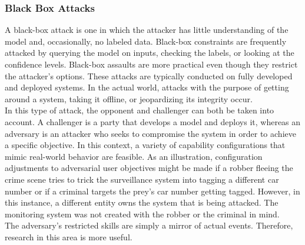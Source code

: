 \documentclass[ 12pt,a4paper,twocolumn,fleqn]{article}
\begin{document}
\subsubsection{Black Box Attacks}
A black-box attack is one in which the attacker has little understanding of the model and, occasionally, no labeled data. Black-box constraints are frequently attacked by querying the model on inputs, checking the labels, or looking at the confidence levels. Black-box assaults are more practical even though they restrict the attacker's options. These attacks are typically conducted on fully developed and deployed systems. In the actual world, attacks with the purpose of getting around a system, taking it offline, or jeopardizing its integrity occur.\\
%
In this type of attack, the opponent and challenger can both be taken into account. A challenger is a party that develops a model and deploys it, whereas an adversary is an attacker who seeks to compromise the system in order to achieve a specific objective. In this context, a variety of capability configurations that mimic real-world behavior are feasible. As an illustration, configuration adjustments to adversarial user objectives might be made if a robber fleeing the crime scene tries to trick the surveillance system into tagging a different car number or if a criminal targets the prey's car number getting tagged. However, in this instance, a different entity owns the system that is being attacked. The monitoring system was not created with the robber or the criminal in mind.\\
%
The adversary's restricted skills are simply a mirror of actual events. Therefore, research in this area is more useful.\\
\end{document}
